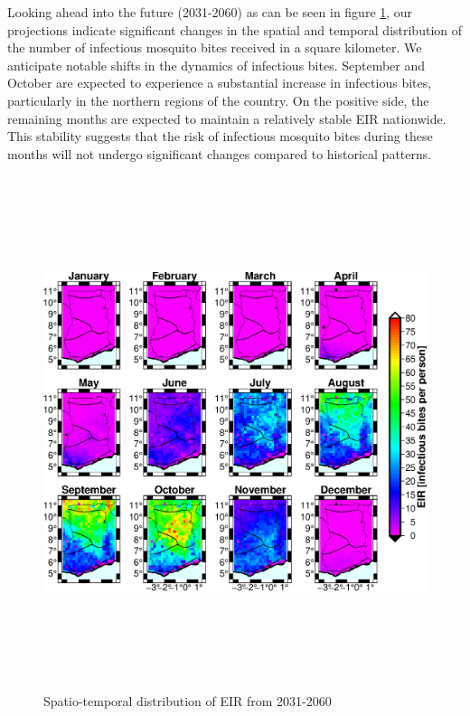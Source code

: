 \documentclass[utf8]{FrontiersinHarvard} %
\begin{document}
Looking ahead into the future (2031-2060) as can be seen in figure \ref{fig:3:8}, our projections indicate significant changes in the spatial and temporal distribution of the number of infectious mosquito bites received in a square kilometer. We anticipate notable shifts in the dynamics of infectious bites. September and October are expected to experience a substantial increase in infectious bites, particularly in the northern regions of the country. On the positive side, the remaining months are expected to maintain a relatively stable EIR nationwide. This stability suggests that the risk of infectious mosquito bites during these months will not undergo significant changes compared to historical patterns.
\begin{figure}[ht]
\begin{center}
\includegraphics[width=15cm,height=15cm]{EIR_MPI-M-MPI-ESM-LR_rcp26_2031-2060_biascorrected.eps}
\caption{Spatio-temporal distribution of EIR from 2031-2060}
\label{fig:3:8}
\end{center}
\end{figure}
\end{document}
